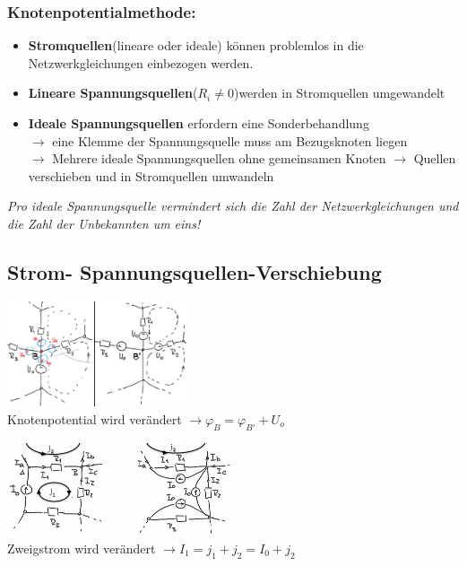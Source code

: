 \subsubsection{Knotenpotentialmethode:}
\begin{itemize}
	\item \textbf{Stromquellen}(lineare oder ideale) können problemlos in die Netzwerkgleichungen einbezogen werden.
	\item \textbf{Lineare Spannungsquellen}($R_{i} \not = 0$)werden in Stromquellen umgewandelt
	\item \textbf{Ideale Spannungsquellen} erfordern eine Sonderbehandlung\\ $\rightarrow$ eine Klemme der Spannungsquelle muss am Bezugsknoten liegen\\
	 $\rightarrow$ Mehrere ideale Spannungsquellen ohne gemeinsamen Knoten $\rightarrow$  Quellen verschieben und in Stromquellen umwandeln
\end{itemize}
\emph{Pro ideale Spannungsquelle vermindert sich die Zahl der Netzwerkgleichungen und die Zahl der Unbekannten um eins!}

\subsection{Strom- Spannungsquellen-Verschiebung}
\begin{multicols}{2}
\begin{center}
\includegraphics[width=0.4\textwidth]{pics/dcnet/UQuellenver}\\
Knotenpotential wird verändert $\rightarrow \varphi_B = \varphi_{B'} + U_o$
\end{center}
\begin{center}
\includegraphics[width=0.5\textwidth]{pics/dcnet/IQuellenver}\\
Zweigstrom wird verändert $\rightarrow I_1 = j_1 + j_2 = I_0 + j_2$
\end{center}
\end{multicols}

